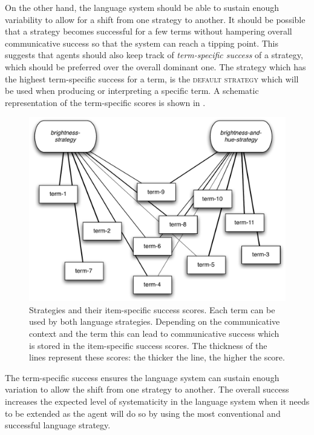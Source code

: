 On the other hand, the language system should be able to sustain
enough variability to allow for a shift from one strategy to
another. It should be possible that a strategy becomes successful for
a few terms without hampering overall communicative success so that
the system can reach a tipping point. This suggests that agents should
also keep track of \emph{term-specific success} of a strategy, which
should be preferred over the overall dominant one. The strategy which
has the highest term-specific success for a term, is the \textsc{default
  strategy} which will be used when producing or interpreting a
specific term. A schematic representation of the term-specific scores
is shown in .

\begin{figure}[htpb]
  \begin{center}
    \includegraphics[width=.8\textwidth]{./selection/figures/strategies-scores.pdf}
    \caption[Strategies and their item-specific success
    scores]{Strategies and their item-specific success scores. Each
      term can be used by both language strategies. Depending on the
      communicative context and the term this can lead to
      communicative success which is stored in the item-specific
      success scores. The thickness of the lines represent these
      scores: the thicker the line, the higher the score.}
    \label{f:ls-strategies-and-scores}
  \end{center}
\end{figure}

The term-specific success ensures the language system can sustain
enough variation to allow the shift from one strategy to another. The
overall success increases the expected level of systematicity in the
language system when it needs to be extended as the agent will do so
by using the most conventional and successful language strategy.

